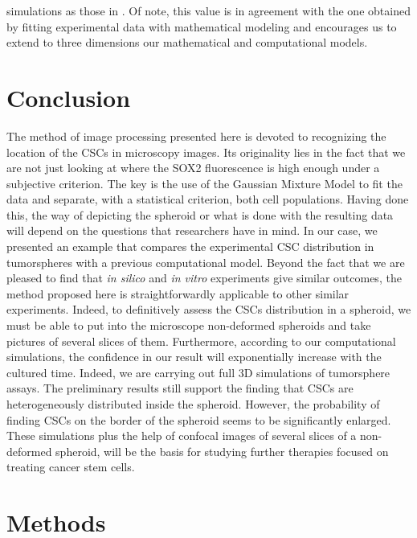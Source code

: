 \documentclass[fleqn,10pt]{wlscirep}
\begin{document}
simulations as those in \cite{barberis2021percolation}. Of note, this value is in agreement with the one obtained by fitting experimental data with mathematical modeling\cite{benitez2021} and encourages us to extend to three dimensions our mathematical and computational models.
     

\section*{Conclusion}

The method of image processing presented here is devoted to recognizing the location of the CSCs in microscopy images. Its originality lies in the fact that we are not just looking at where the SOX2 fluorescence is high enough under a subjective criterion. The key is the use of the Gaussian Mixture Model to fit the data and separate, with a statistical criterion, both cell populations. Having done this, the way of depicting the spheroid or what is done with the resulting data will depend on the questions that researchers have in mind. In our case, we presented an example that compares the experimental CSC distribution in tumorspheres with a previous computational model. Beyond the fact that we are pleased to find that \emph{in silico} and \emph{in vitro} experiments give similar outcomes, the method proposed here is straightforwardly applicable to other similar experiments. Indeed, to definitively assess the CSCs distribution in a spheroid, we must be able to put into the microscope non-deformed spheroids and take pictures of several slices of them.
Furthermore, according to our computational simulations, the confidence in our result will exponentially increase with the cultured time. Indeed, we are carrying out full 3D simulations of tumorsphere assays. The preliminary results still support the finding that CSCs are heterogeneously distributed inside the spheroid. However, the probability of finding CSCs on the border of the spheroid seems to be significantly enlarged. These simulations plus the help of confocal images of several slices of a non-deformed spheroid, will be the basis for studying further therapies focused on treating cancer stem cells. 
             
   



\section*{Methods} \label{s: methods}
\end{document}
